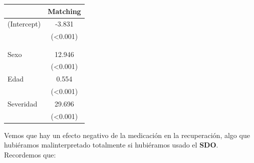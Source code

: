 \documentclass[
  letterpaper,
  DIV=11,
  numbers=noendperiod,
  oneside]{scrreprt}
\newenvironment{Shaded}{\begin{snugshade}}{\end{snugshade}}
\newcommand{\AttributeTok}[1]{\textcolor[rgb]{0.40,0.45,0.13}{#1}}
\newcommand{\DecValTok}[1]{\textcolor[rgb]{0.68,0.00,0.00}{#1}}
\newcommand{\FunctionTok}[1]{\textcolor[rgb]{0.28,0.35,0.67}{#1}}
\newcommand{\NormalTok}[1]{\textcolor[rgb]{0.00,0.23,0.31}{#1}}
\newcommand{\OtherTok}[1]{\textcolor[rgb]{0.00,0.23,0.31}{#1}}
\newcommand{\SpecialCharTok}[1]{\textcolor[rgb]{0.37,0.37,0.37}{#1}}
\newcommand{\StringTok}[1]{\textcolor[rgb]{0.13,0.47,0.30}{#1}}
\begin{document}
\begin{table}
\fontsize{12.0pt}{14.4pt}\selectfont
\begin{tabular*}{\linewidth}{@{\extracolsep{\fill}}lc}
\toprule
  & Matching \\ 
\midrule\addlinespace[2.5pt]
(Intercept) & -3.831 \\ 
 & (<0.001) \\ 
{\bfseries \cellcolor[HTML]{rgba(255,255,224,0.8)}{\textcolor[HTML]{000000}{Medicina}}} & {\bfseries \cellcolor[HTML]{rgba(255,255,224,0.8)}{\textcolor[HTML]{000000}{-9.944}}} \\ 
{\bfseries \cellcolor[HTML]{rgba(255,255,224,0.8)}{\textcolor[HTML]{000000}{}}} & {\bfseries \cellcolor[HTML]{rgba(255,255,224,0.8)}{\textcolor[HTML]{000000}{(<0.001)}}} \\ 
Sexo & 12.946 \\ 
 & (<0.001) \\ 
Edad & 0.554 \\ 
 & (<0.001) \\ 
Severidad & 29.696 \\ 
 & (<0.001) \\ 
\bottomrule
\end{tabular*}
\end{table}

Vemos que hay un efecto negativo de la medicación en la recuperación,
algo que hubiéramos malinterpretado totalmente si hubiéramos usado el
\textbf{SDO}. Recordemos que:

\begin{Shaded}
\end{Shaded}
\end{document}
